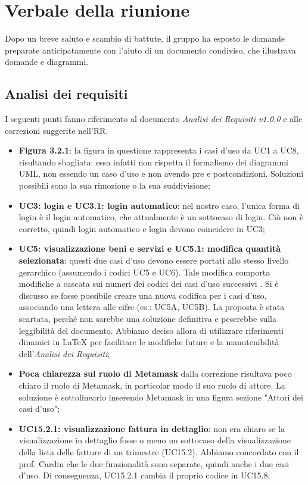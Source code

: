 \section{Verbale della riunione}
Dopo un breve saluto e scambio di battute, il gruppo ha esposto le domande preparate anticipatamente con l'aiuto di un documento condiviso, che illustrava domande e diagrammi.

\subsection{Analisi dei requisiti}
I seguenti punti fanno riferimento al documento \textit{Analisi dei Requisiti v1.0.0} e alle correzioni suggerite nell'RR.
\begin{itemize}
	\item \textbf{Figura 3.2.1}: la figura in questione rappresenta i casi d'uso da UC1 a UC8, risultando sbagliata: essa infatti non rispetta il formalismo dei diagrammi UML, non essendo un caso d'uso e non avendo pre e postcondizioni. Soluzioni possibili sono la sua rimozione o la sua suddivisione;
	\item \textbf{UC3: login e UC3.1: login automatico}: nel nostro caso, l'unica forma di login è il login automatico, che attualmente è un sottocaso di login. Ciò non è corretto, quindi login automatico e login devono coincidere in UC3;
	\item \textbf{UC5: visualizzazione beni e servizi e UC5.1: modifica quantità selezionata}: questi due casi d'uso devono essere portati allo stesso livello gerarchico (assumendo i codici UC5 e UC6). Tale modifica comporta modifiche a cascata sui numeri dei codici dei casi d'uso successivi . Si è discusso se fosse possibile creare una nuova codifica per i casi d'uso, associando una lettera alle cifre (es.: UC5A, UC5B). La proposta è stata scartata, perché non sarebbe una soluzione definitiva e peserebbe sulla leggibilità del documento. Abbiamo deciso allora di utilizzare riferimenti dinamici in \LaTeX{} per facilitare le modifiche future e la manutenibilità dell'\textit{Analisi dei Requisiti};
	\item \textbf{Poca chiarezza sul ruolo di Metamask} dalla correzione risultava poco chiaro il ruolo di Metamask, in particolar modo il suo ruolo di attore. La soluzione è sottolinearlo inserendo Metamask in una figura sezione "Attori dei casi d'uso";
	\item \textbf{UC15.2.1: visualizzazione fattura in dettaglio}: non era chiaro se la visualizzazione in dettaglio fosse o meno un sottocaso della visualizzazione della lista delle fatture di un trimestre (UC15.2). Abbiamo concordato con il prof. Cardin che le due funzionalità sono separate, quindi anche i due casi d'uso. Di conseguenza, UC15.2.1 cambia il proprio codice in UC15.8;

\end{itemize}
